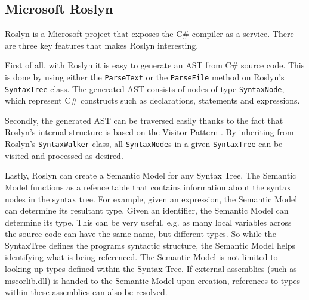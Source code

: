 \subsection{Microsoft Roslyn} %
\label{sub:microsoft_roslyn}
	Roslyn is a Microsoft project that exposes the C\# compiler as a service. There are three key features that makes Roslyn interesting.

	First of all, with Roslyn it is easy to generate an AST from C\# source code. This is done by using either the \texttt{ParseText} or the \texttt{ParseFile} method on Roslyn's \texttt{SyntaxTree} class. The generated AST consists of nodes of type \texttt{SyntaxNode}, which represent C\# constructs such as declarations, statements and expressions.

	Secondly, the generated AST can be traversed easily thanks to the fact that Roslyn's internal structure is based on the Visitor Pattern \cite{bib:visitorpattern}. By inheriting from Roslyn's \texttt{SyntaxWalker} class, all \texttt{SyntaxNode}s in a given \texttt{SyntaxTree} can be visited and processed as desired. 

	Lastly, Roslyn can create a Semantic Model for any Syntax Tree. The Semantic Model functions as a refence table that contains information about the syntax nodes in the syntax tree. For example, given an expression, the Semantic Model can determine its resultant type. Given an identifier, the Semantic Model can determine its type. This can be very useful, e.g. as many local variables across the source code can have the same name, but different types. So while the SyntaxTree defines the programs syntactic structure, the Semantic Model helps identifying what is being referenced. The Semantic Model is not limited to looking up types defined within the Syntax Tree. If external assemblies (such as mscorlib.dll) is handed to the Semantic Model upon creation, references to types within these assemblies can also be resolved.


